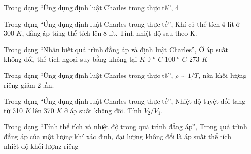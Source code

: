 \begin{ex}
Trong dạng “Ứng dụng định luật Charles trong thực tế”, 4
\choiceTF

\end{ex}

\begin{ex}
Trong dạng “Ứng dụng định luật Charles trong thực tế”, Khí có thể tích 4 lít ở 300 $K$, đẳng áp tăng thể tích lên 8 lít. Tính nhiệt độ sau theo K.
\end{ex}

\begin{ex}
Trong dạng “Nhận biết quá trình đẳng áp và định luật Charles”, Ở áp suất không đổi, thể tích ngoại suy bằng không tại
\choice
{ $K$}
{0 ° $C$}
{100 ° $C$}
{273 $K$}
\end{ex}

\begin{bt}
Trong dạng “Ứng dụng định luật Charles trong thực tế”, $\rho\sim1/T$, nên khối lượng riêng giảm 2 lần.
\end{bt}

\begin{ex}
Trong dạng “Ứng dụng định luật Charles trong thực tế”, Nhiệt độ tuyệt đối tăng từ 310 $K$ lên 370 $K$ ở áp suất không đổi. Tính $V_2/V_1$.
\end{ex}

\begin{ex}
Trong dạng “Tính thể tích và nhiệt độ trong quá trình đẳng áp”, Trong quá trình đẳng áp của một lượng khí xác định, đại lượng không đổi là
\choice
{\True áp suất}
{thể tích}
{nhiệt độ}
{khối lượng riêng}
\end{ex}

